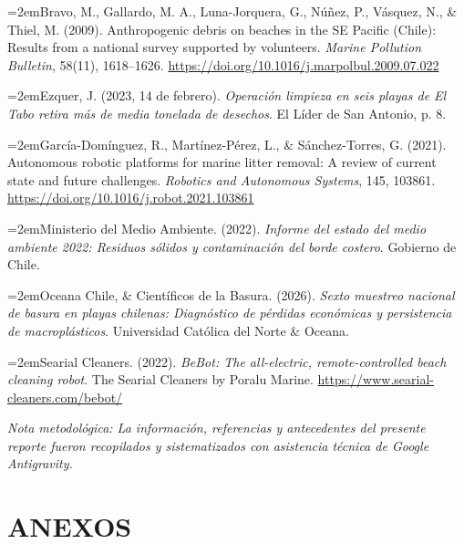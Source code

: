 \documentclass[12pt,letterpaper]{article}
\newcommand{\hangapa}{\par\noindent\hangindent=2em\hangafter=1}
\begin{document}
\hangapa Bravo, M., Gallardo, M. A., Luna-Jorquera, G., Núñez, P., Vásquez, N., \& Thiel, M. (2009). Anthropogenic debris on beaches in the SE Pacific (Chile): Results from a national survey supported by volunteers. \textit{Marine Pollution Bulletin}, 58(11), 1618--1626. \url{https://doi.org/10.1016/j.marpolbul.2009.07.022}

\hangapa Ezquer, J. (2023, 14 de febrero). \textit{Operación limpieza en seis playas de El Tabo retira más de media tonelada de desechos}. El Líder de San Antonio, p. 8.

\hangapa García-Domínguez, R., Martínez-Pérez, L., \& Sánchez-Torres, G. (2021). Autonomous robotic platforms for marine litter removal: A review of current state and future challenges. \textit{Robotics and Autonomous Systems}, 145, 103861. \url{https://doi.org/10.1016/j.robot.2021.103861}

\hangapa Ministerio del Medio Ambiente. (2022). \textit{Informe del estado del medio ambiente 2022: Residuos sólidos y contaminación del borde costero}. Gobierno de Chile.

\hangapa Oceana Chile, \& Científicos de la Basura. (2026). \textit{Sexto muestreo nacional de basura en playas chilenas: Diagnóstico de pérdidas económicas y persistencia de macroplásticos}. Universidad Católica del Norte \& Oceana.

\hangapa Searial Cleaners. (2022). \textit{BeBot: The all-electric, remote-controlled beach cleaning robot}. The Searial Cleaners by Poralu Marine. \url{https://www.searial-cleaners.com/bebot/}

\vspace{0.8cm}
\noindent\textit{\footnotesize *Nota metodológica: La información, referencias y antecedentes del presente reporte fueron recopilados y sistematizados con asistencia técnica de Google Antigravity.}

\clearpage

\appendix
\section*{ANEXOS}

\end{document}
